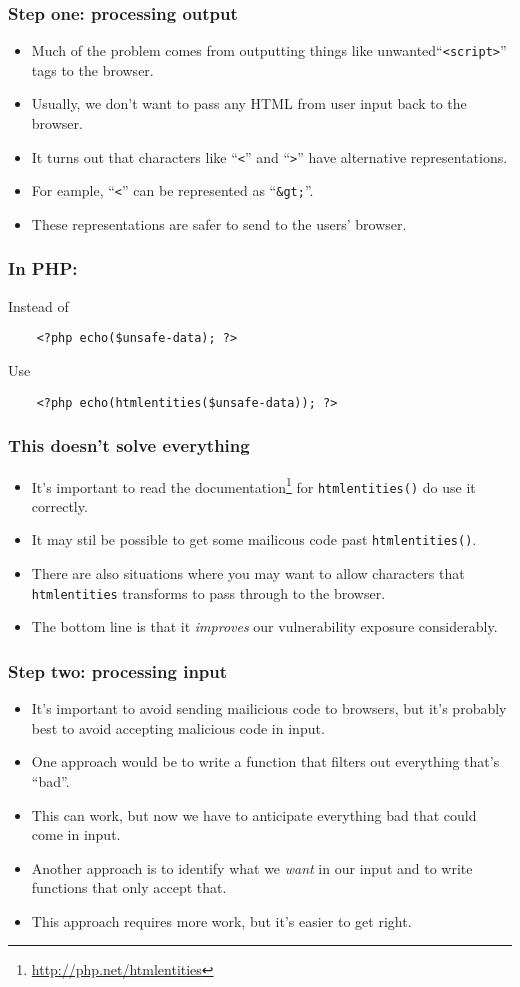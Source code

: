 \documentclass[10pt]{beamer}
\begin{document}
\begin{frame}
	\frametitle{Step one: processing output}

	\begin{itemize}
		\item Much of the problem comes from outputting things
			like unwanted``\texttt{<script>}'' tags to the browser.
		\item Usually, we don't want to pass any HTML from user input
			back to the browser.
		\item It turns out that characters like ``\texttt{<}'' and
			``\texttt{>}'' have alternative representations.
		\item For eample, ``\texttt{<}'' can be represented as 
			``\texttt{\&gt;}''.
		\item These representations are safer to send to the users' browser.
	\end{itemize}
\end{frame}
\begin{frame}[fragile]
	\frametitle{In PHP:}
	Instead of 
	\begin{verbatim}
    <?php echo($unsafe-data); ?> 
	\end{verbatim}
	Use
	\begin{verbatim}
    <?php echo(htmlentities($unsafe-data)); ?> 
	\end{verbatim}
\end{frame}
\begin{frame}
	\frametitle{This doesn't solve everything}
	\begin{itemize}
		\item It's important to read the documentation\footnote{\url{http://php.net/htmlentities}} for \texttt{htmlentities()} do use it correctly.
		\item It may stil be possible to get some mailicous code past
			\texttt{htmlentities()}.
		\item There are also situations where you may want to allow 
			characters that \texttt{htmlentities} transforms to
			pass through to the browser.
		\item The bottom line is that it \emph{improves} our vulnerability 
			exposure considerably.
	\end{itemize}
\end{frame}
\begin{frame}
	\frametitle{Step two: processing input}
	\begin{itemize}
		\item It's important to avoid sending mailicious code to 
			browsers, but it's probably best to avoid accepting
			malicious code in input.
		\item One approach would be to write a function that filters 
			out everything that's ``bad''.
		\item This can work, but now we have to anticipate everything
			bad that could come in input.
		\item Another approach is to identify what we \emph{want} in 
			our input and to write functions that only accept that.
		\item This approach requires more work, but it's easier to get
			right.
	\end{itemize}
\end{frame}
\end{document}
